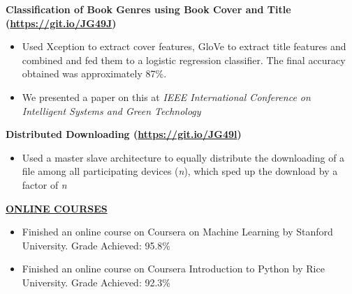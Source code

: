 \documentclass{article}
\begin{document}
\noindent \textbf{Classification of Book Genres using Book Cover and Title (\url{https://git.io/JG49J})} 
\begin{itemize}[noitemsep,nolistsep,leftmargin=*]
\item {Used Xception to extract cover features, GloVe to extract title features and combined and fed them to a logistic regression classifier. The final accuracy obtained was approximately 87\%.}
\item {We presented a paper on this at \textit{IEEE International Conference on Intelligent Systems and Green Technology}\\}
\end{itemize}

\noindent \textbf{Distributed Downloading (\url{https://git.io/JG49l})} 
\begin{itemize}[noitemsep,nolistsep,leftmargin=*]
\item {Used a master slave architecture to equally distribute the downloading of a file among all participating devices (\textit{n}), which sped up the download by a factor of \textit{n} \\}
\end{itemize}


\noindent \textbf{\underline{ONLINE COURSES}}
\begin{itemize}[noitemsep,nolistsep,leftmargin=*]
\item {Finished an online course on Coursera on Machine Learning by Stanford University. Grade Achieved: 95.8\%} 
\item {Finished an online course on Coursera Introduction to Python by Rice University. Grade Achieved: 92.3\%}
\end{itemize}
\end{document}
